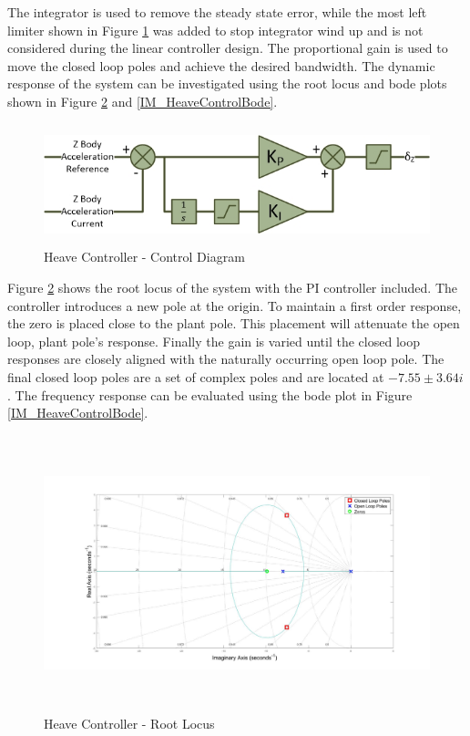 	 The integrator is used to remove the steady state error, while the most left limiter shown in Figure \ref{IM_HeaveController} was added to stop integrator wind up and is not considered during the linear controller design. The proportional gain is used to move the closed loop poles and achieve the desired bandwidth. The dynamic response of the system can be investigated using the root locus and bode plots shown in Figure \ref{IM_HeaveControlRoot} and \ref{IM_HeaveControlBode}. 
	 
	 \begin{figure}[H]
	 	\centering
	 	\includegraphics[height = 3.5cm]{../References/Diagrams/HeaveController.jpg}
	 	\caption{Heave Controller -  Control Diagram}
	 	\label{IM_HeaveController}
	 \end{figure}
	 
	 Figure \ref{IM_HeaveControlRoot} shows the root locus of the system with the PI controller included. The controller introduces a new pole at the origin. To maintain a first order response, the zero is placed close to the plant pole. This placement will attenuate the open loop, plant pole's response. Finally the gain is varied until the closed loop responses are closely aligned with the naturally occurring open loop pole. The final closed loop poles are a set of complex poles and are located at $-7.55 \pm 3.64 i$. The frequency response can be evaluated using the bode plot in Figure \ref{IM_HeaveControlBode}. 
	 
	 \begin{figure}[H]
	 	\centering
	 	\includegraphics[height = 8cm]{../Design/Matlab/Controllers/heave_root.jpg}
	 	\caption{Heave Controller -  Root Locus}
	 	\label{IM_HeaveControlRoot}
	 \end{figure}
	 
